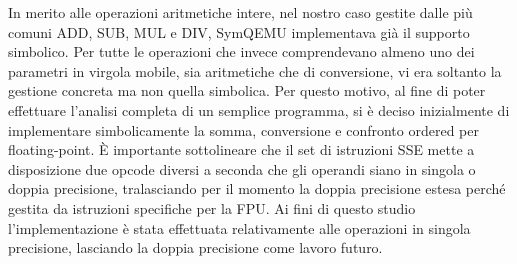 \documentclass[Lau, oneside]{sapthesis}%
\begin{document}
In merito alle operazioni aritmetiche intere, nel nostro caso gestite dalle più comuni ADD, SUB, MUL e DIV, SymQEMU implementava già il supporto simbolico.
\newline
Per tutte le operazioni che invece comprendevano almeno uno dei parametri in virgola mobile, sia aritmetiche che di conversione, vi era soltanto la gestione concreta ma non quella simbolica.
\newline \newline
Per questo motivo, al fine di poter effettuare l'analisi completa di un semplice programma, si è deciso inizialmente di implementare simbolicamente la somma, conversione e confronto ordered per floating-point.
\newline
È importante sottolineare che il set di istruzioni SSE mette a disposizione due opcode diversi a seconda che gli operandi siano in singola o doppia precisione, tralasciando per il momento la doppia precisione estesa perché gestita da istruzioni specifiche per la FPU.
\newline
Ai fini di questo studio l'implementazione è stata effettuata relativamente alle operazioni in singola precisione, lasciando la doppia precisione come lavoro futuro.
\end{document}
